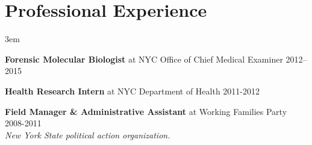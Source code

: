 \documentclass[]{article}
\begin{document}
\vspace{2mm}
\section{Professional Experience}

\vspace{2mm}
\leftskip 3em

\textbf{Forensic Molecular Biologist} at NYC Office of Chief Medical Examiner \hfill 2012--2015
   
\textbf{Health Research Intern} at NYC Department of Health \hfill 2011-2012
     
\textbf{Field Manager \& Administrative Assistant} at Working Families Party \hfill 2008-2011\\
\textit{New York State political action organization.}
\end{document}
